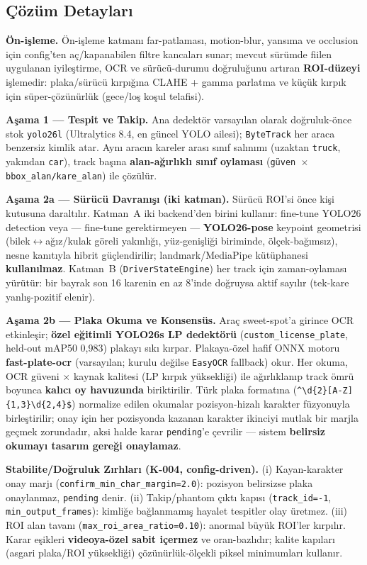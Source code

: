 \documentclass[12pt,a4paper]{article}
\newcommand{\tcode}[1]{\texttt{\small #1}}
\begin{document}
\subsection{Çözüm Detayları}
\textbf{Ön-işleme.} Ön-işleme katmanı far-patlaması, motion-blur, yansıma ve occlusion için
config'ten aç/kapanabilen filtre kancaları sunar; mevcut sürümde fiilen uygulanan iyileştirme,
OCR ve sürücü-durumu doğruluğunu artıran \textbf{ROI-düzeyi} işlemedir: plaka/sürücü kırpığına
CLAHE + gamma parlatma ve küçük kırpık için süper-çözünürlük (gece/loş koşul telafisi).

\textbf{Aşama 1 — Tespit ve Takip.} Ana dedektör varsayılan olarak doğruluk-önce stok \tcode{yolo26l}
(Ultralytics 8.4, en güncel YOLO ailesi); \tcode{ByteTrack} her araca benzersiz kimlik atar. Aynı
aracın kareler arası sınıf salınımı (uzaktan \tcode{truck}, yakından \tcode{car}), track başına
\textbf{alan-ağırlıklı sınıf oylaması} (\tcode{güven $\times$ bbox\_alan/kare\_alan}) ile çözülür.

\textbf{Aşama 2a — Sürücü Davranışı (iki katman).} Sürücü ROI'si önce kişi kutusuna daraltılır.
Katman~A iki backend'den birini kullanır: fine-tune YOLO26 detection veya — fine-tune gerektirmeyen —
\textbf{YOLO26-pose} keypoint geometrisi (bilek$\leftrightarrow$ağız/kulak göreli yakınlığı,
yüz-genişliği biriminde, ölçek-bağımsız), nesne kanıtıyla hibrit güçlendirilir; landmark/MediaPipe
kütüphanesi \textbf{kullanılmaz}. Katman~B (\tcode{DriverStateEngine}) her track için zaman-oylaması
yürütür: bir bayrak son 16 karenin en az 8'inde doğruysa aktif sayılır (tek-kare yanlış-pozitif elenir).

\textbf{Aşama 2b — Plaka Okuma ve Konsensüs.} Araç sweet-spot'a girince OCR etkinleşir; \textbf{özel
eğitimli YOLO26s LP dedektörü} (\tcode{custom\_license\_plate}, held-out mAP50 0,983) plakayı sıkı
kırpar. Plakaya-özel hafif ONNX motoru \textbf{fast-plate-ocr} (varsayılan; kurulu değilse
\tcode{EasyOCR} fallback) okur. Her okuma, OCR güveni $\times$ kaynak kalitesi (LP kırpık yüksekliği)
ile ağırlıklanıp track ömrü boyunca \textbf{kalıcı oy havuzunda} biriktirilir. Türk plaka formatına
(\tcode{\^{}\textbackslash d\{2\}[A-Z]\{1,3\}\textbackslash d\{2,4\}\$}) normalize edilen okumalar
pozisyon-hizalı karakter füzyonuyla birleştirilir; onay için her pozisyonda kazanan karakter ikinciyi
mutlak bir marjla geçmek zorundadır, aksi halde karar \tcode{pending}'e çevrilir — sistem
\textbf{belirsiz okumayı tasarım gereği onaylamaz}.

\textbf{Stabilite/Doğruluk Zırhları (K-004, config-driven).} (i) Kayan-karakter onay marjı
(\tcode{confirm\_min\_char\_margin=2.0}): pozisyon belirsizse plaka onaylanmaz, \tcode{pending} denir.
(ii) Takip/phantom çıktı kapısı (\tcode{track\_id=-1}, \tcode{min\_output\_frames}): kimliğe bağlanmamış
hayalet tespitler olay üretmez. (iii) ROI alan tavanı (\tcode{max\_roi\_area\_ratio=0.10}): anormal
büyük ROI'ler kırpılır. Karar eşikleri \textbf{videoya-özel sabit içermez} ve oran-bazlıdır; kalite
kapıları (asgari plaka/ROI yüksekliği) çözünürlük-ölçekli piksel minimumları kullanır.
\end{document}
